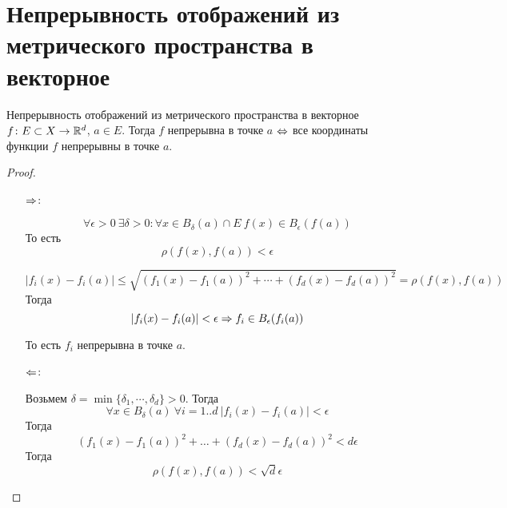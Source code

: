 ﻿\section{Непрерывность отображений из метрического пространства в векторное}

\begin{theorem}{Непрерывность отображений из метрического пространства в векторное}
$f\colon E \subset X \rightarrow \mathbb{R}^{d}$, $a \in E$. Тогда $f$ непрерывна в точке $a$ $\Leftrightarrow$ все координаты функции $f$ непрерывны в точке $a$.
\end{theorem}

\begin{proof}
\begin{itemize}
\item[$\Rightarrow$:]

$$\forall \epsilon > 0\: \exists \delta > 0\colon \forall x \in B_{\delta}(a) \cap E\: f(x) \in B_{\epsilon}(f(a)) $$
То есть 
$$\rho(f(x), f(a)) < \epsilon$$

$$|f_i(x) - f_i(a)| \leqslant \sqrt{(f_1(x) - f_1(a))^2 + \cdots + (f_d(x) - f_d(a))^2} = \rho(f(x), f(a))$$
Тогда
$$|f_i(x) - f_i(a)| < \epsilon \Rightarrow f_i \in B_{\epsilon}(f_i(a))$$

То есть $f_i$ непрерывна в точке $a$.

\item[$\Leftarrow$:]
  
Возьмем $\delta = \min\{\delta_1, \cdots, \delta_d\} > 0$. Тогда 
$$\forall x \in B_{\delta}(a)\: \forall i = 1..d\: |f_i(x) - f_i(a)| < \epsilon$$
Тогда
$$(f_1(x) - f_1(a))^2 + \ldots + (f_d(x)-f_d(a))^2 < d \epsilon$$
Тогда
$$\rho(f(x), f(a)) < \sqrt{d} \epsilon$$
\end{itemize}
\end{proof}